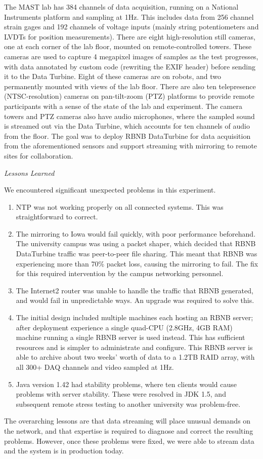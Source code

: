 The MAST lab has 384 channels of data acquisition, running on a National Instruments platform and sampling at 1Hz. This includes data from 256 channel strain gages and 192 channels of voltage inputs (mainly string potentiometers and LVDTs for position measurements). There are eight high-resolution still cameras, one at each corner of the lab floor, mounted on remote-controlled towers. These cameras are used to capture 4 megapixel images of samples as the test progresses, with data annotated by custom code (rewriting the EXIF header) before sending it to the Data Turbine.  Eight of these cameras are on robots, and two permanently mounted with views of the lab floor. There are also ten telepresence (NTSC-resolution) cameras on pan-tilt-zoom (PTZ) platforms to provide remote participants with a sense of the state of the lab and experiment. The camera towers and PTZ cameras also have audio microphones, where the sampled sound is streamed out via the Data Turbine, which accounts for ten channels of audio from the floor. The goal was to deploy RBNB DataTurbine  for data acquisition
from the aforementioned sensors and support streaming with mirroring to remote sites for collaboration. 

\emph{Lessons Learned}

We encountered significant unexpected problems in this experiment. 
\begin{enumerate}
\item NTP was not working properly on all connected systems. This was straightforward to correct.
\item The mirroring to Iowa would fail quickly, with poor performance beforehand. The university campus was using a packet shaper, which decided that RBNB DataTurbine traffic was peer-to-peer file sharing. This meant that RBNB was experiencing more than 70\% packet loss, causing the mirroring to fail. The fix for this required intervention by the %
campus networking personnel.
\item The %
Internet2 router was unable to handle the traffic that RBNB generated, and would fail in unpredictable ways. An upgrade was required to solve this.
\item The initial design included multiple machines each hosting an RBNB server; after deployment experience a single quad-CPU (2.8GHz, 4GB RAM) machine running a single RBNB server is used instead. This has sufficient resources and is simpler to administrate and configure. This RBNB server is able to archive about two weeks' worth of data to a 1.2TB RAID array, with all 300+ DAQ channels and video sampled at 1Hz.
\item Java version 1.42 had stability problems, where ten clients would cause problems with server stability. These were resolved in JDK 1.5, and subsequent remote stress testing to another university was problem-free.
\end{enumerate}

The overarching lessons are that data streaming will place unusual demands on the network, and that expertise is required to diagnose and correct the resulting problems. However, once these problems were fixed, we were able to stream data and the system is in production today. 
